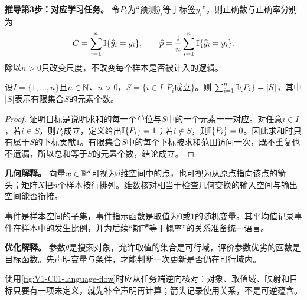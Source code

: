 \textbf{推导第3步：对应学习任务。} 令$P_i$为“预测$\widehat y_i$等于标签$y_i$”，则正确数与正确率分别为
\[
C=\sum_{i=1}^{n}\mathbb{I}\{\widehat y_i=y_i\},\qquad
\widehat p=\frac1n\sum_{i=1}^{n}\mathbb{I}\{\widehat y_i=y_i\}.
\]
除以$n>0$只改变尺度，不改变每个样本是否被计入的逻辑。

\begin{theorem}[有限指示和的计数性质]\label{thm:V1-C01-indicator-count}\label{schema:V1-C01:CH-12}
设$I=\{1,\ldots,n\}$且$n\in\mathbb{N}$、$n>0$，$S=\{i\in I:P_i\text{成立}\}$。则
$\sum_{i=1}^{n}\mathbb{I}\{P_i\}=|S|$，其中$|S|$表示有限集合$S$的元素个数。
\end{theorem}
\begin{proof}\label{schema:V1-C01:CH-13}
证明目标是说明求和的每一个单位与$S$中的一个元素一一对应。对任意$i\in I$，若$i\in S$，则$P_i$成立，定义给出$\mathbb{I}\{P_i\}=1$；若$i\notin S$，则$\mathbb{I}\{P_i\}=0$。因此求和时只有属于$S$的下标贡献$1$。有限集合$S$中的每个下标被求和范围访问一次，既不重复也不遗漏，所以总和等于$S$的元素个数，结论成立。
\end{proof}

\begin{geometrybox}\label{schema:V1-C01:CH-14}
\textbf{几何解释。} 向量$\boldsymbol{x}\in\mathbb{R}^d$可视为$d$维空间中的点，也可视为从原点指向该点的箭头；矩阵$X$把$n$个样本按行排列。维数核对相当于检查几何变换的输入空间与输出空间能否衔接。
\end{geometrybox}
\begin{probabilitybox}\label{schema:V1-C01:CH-15}
事件是样本空间的子集，事件指示函数是取值为$0$或$1$的随机变量。其平均值记录事件在样本中的发生比例，并为后续“期望等于概率”的关系准备统一语言。
\end{probabilitybox}
\begin{optimizationbox}\label{schema:V1-C01:CH-16}
\textbf{优化解释。} 参数$\theta$是搜索对象，允许取值的集合是可行域，评价参数优劣的函数是目标函数。先声明变量与条件，才能判断一次更新是否仍在可行域内。
\end{optimizationbox}


使用\cref{fig:V1-C01-language-flow}时应从任务端逆向核对：对象、取值域、映射和目标只要有一项未定义，就先补全声明再计算；箭头记录使用关系，不是可逆蕴含。

